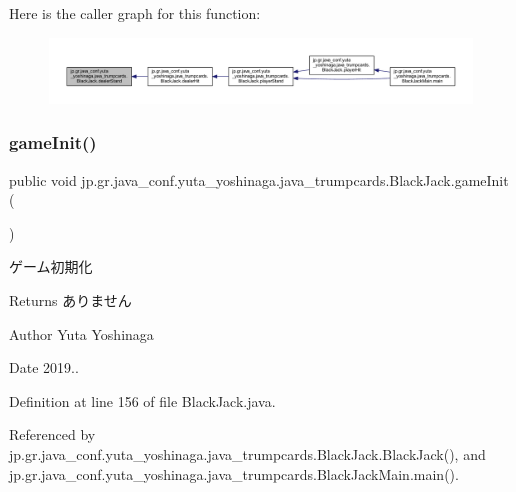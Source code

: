Here is the caller graph for this function\+:
\nopagebreak
\begin{figure}[H]
\begin{center}
\leavevmode
\includegraphics[width=350pt]{classjp_1_1gr_1_1java__conf_1_1yuta__yoshinaga_1_1java__trumpcards_1_1_black_jack_a49f2f12998ffa9892f4e8212f85afc7f_icgraph}
\end{center}
\end{figure}
\mbox{\label{classjp_1_1gr_1_1java__conf_1_1yuta__yoshinaga_1_1java__trumpcards_1_1_black_jack_aecf1c840d9643b4809cd5e93710256a4}} 
\subsubsection{\texorpdfstring{game\+Init()}{gameInit()}}
{\footnotesize\ttfamily public void jp.\+gr.\+java\+\_\+conf.\+yuta\+\_\+yoshinaga.\+java\+\_\+trumpcards.\+Black\+Jack.\+game\+Init (\begin{DoxyParamCaption}{ }\end{DoxyParamCaption})}



ゲーム初期化 

\begin{DoxyReturn}{Returns}
ありません 
\end{DoxyReturn}
\begin{DoxyAuthor}{Author}
Yuta Yoshinaga 
\end{DoxyAuthor}
\begin{DoxyDate}{Date}
2019.. 
\end{DoxyDate}


Definition at line 156 of file Black\+Jack.\+java.



Referenced by jp.\+gr.\+java\+\_\+conf.\+yuta\+\_\+yoshinaga.\+java\+\_\+trumpcards.\+Black\+Jack.\+Black\+Jack(), and jp.\+gr.\+java\+\_\+conf.\+yuta\+\_\+yoshinaga.\+java\+\_\+trumpcards.\+Black\+Jack\+Main.\+main().

